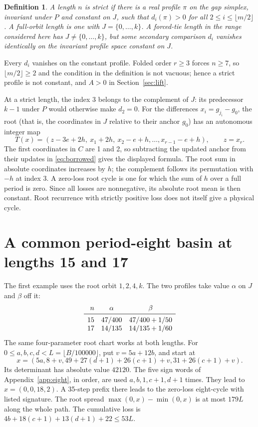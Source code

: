 \documentclass[11pt,reqno]{amsart}
\newtheorem{definition}[theorem]{Definition}
\theoremstyle{remark}
\begin{document}
\begin{definition}\label{def:strict}
A length \(n\) is \emph{strict} if there is a real profile \(\pi\)
on the gap simplex, invariant under \(P\) and constant on \(J\),
such that
\(d_i(\pi)>0\) for all \(2\le i\le\lfloor m/2\rfloor\).
A \emph{full-orbit length} is one with \(J=\{0,\ldots,k\}\).
A \emph{forced-tie length} in the range considered here has
\(J\ne\{0,\ldots,k\}\), but some secondary comparison \(d_i\)
vanishes identically on the invariant profile space constant on \(J\).
\end{definition}

Every \(d_i\) vanishes on the constant profile. Folded order \(r\ge3\)
forces \(n\ge7\), so \(\lfloor m/2\rfloor\ge2\) and the condition in
the definition is not vacuous; hence a strict profile is not constant,
and \(A>0\) in Section~\ref{sec:lift}.

At a strict length, the index 3 belongs to the complement of \(J\): its
predecessor \(k-1\) under \(P\) would otherwise make \(d_2=0\).
For the differences \(x_i=g_{j_i}-g_0\), the root (that is,
the coordinates in \(J\) relative to their anchor \(g_0\)) has
an autonomous integer map
\begin{equation}\label{eq:root}
   T(x)=(z-3e+2h,\ x_1+2h,\ x_2-e+h,\ldots,x_{r-1}-e+h),
   \qquad z=x_r .
\end{equation}
The first coordinates in \(C\) are 1 and 2, so subtracting the
updated anchor from their updates in \eqref{eq:borrowed} gives
the displayed formula. The root sum in absolute coordinates
increases by \(h\); the complement follows its permutation with
\(-h\) at index 3. A zero-loss root cycle is one for which
the sum of \(h\) over a full period is zero. Since all losses are
nonnegative, its absolute root mean is then constant. Root
recurrence with strictly positive loss does not itself give a
physical cycle.

\section{A common period-eight basin at lengths 15 and 17}\label{sec:eight}

The first example uses the root orbit \(1,2,4,k\). The two profiles
take value \(\alpha\) on \(J\) and \(\beta\) off it:
\[
 \begin{array}{rcc}
 n & \alpha & \beta\\
 \midrule
 15 & 47/400 & 47/400+1/50 \\
 17 & 14/135 & 14/135+1/60
 \end{array}
\]
The same four-parameter root chart works at both lengths.
For \(0\le a,b,c,d<L=\lfloor B/100000\rfloor\), put
\(v=5a+12b\), and start at
\[
       x=(5a, 8+v, 49+27(d+1)+26(c+1)+v, 31+26(c+1)+v).
\]
Its determinant has absolute value \(42120\). The five sign words of
Appendix~\ref{app:eight}, in order, are used \(a,b,1,c+1,d+1\)
times. They lead to \(x=(0,0,18,2)\). A 35-step prefix there
leads to the zero-loss eight-cycle with listed signature. The
root spread \(\max(0,x)-\min(0,x)\) is at most \(179L\) along
the whole path. The cumulative loss is
\(4b+18(c+1)+13(d+1)+22\le53L\).
\end{document}
